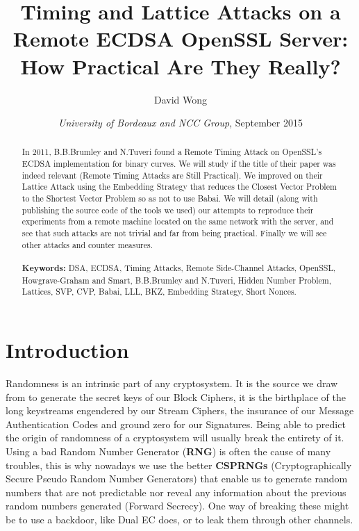 \documentclass[a4paper,11pt]{article}
\title{Timing and Lattice Attacks on a Remote ECDSA OpenSSL Server: How Practical Are They Really?}
\author{David Wong}
\date{\emph{University of Bordeaux and NCC Group}, \small{September 2015}}
\begin{document}
\maketitle

\renewcommand{\abstractname}{Abstract}
\begin{abstract}
In 2011, B.B.Brumley and N.Tuveri found a Remote Timing Attack on OpenSSL's ECDSA implementation for binary curves. We will study if the title of their paper was indeed relevant (Remote Timing Attacks are Still Practical). We improved on their Lattice Attack using the Embedding Strategy that reduces the Closest Vector Problem to the Shortest Vector Problem so as not to use Babai. We will detail (along with publishing the source code of the tools we used) our attempts to reproduce their experiments from a remote machine located on the same network with the server, and see that such attacks are not trivial and far from being practical. Finally we will see other attacks and counter measures.\\
\\
\textbf{Keywords:} DSA, ECDSA, Timing Attacks, Remote Side-Channel Attacks, OpenSSL, Howgrave-Graham and Smart, B.B.Brumley and N.Tuveri, Hidden Number Problem, Lattices, SVP, CVP, Babai, LLL, BKZ, Embedding Strategy, Short Nonces.\\

\end{abstract}

\section{Introduction}\label{introduction}

Randomness is an intrinsic part of any cryptosystem. It is the source we draw from to generate the secret keys of our Block Ciphers, it is the birthplace of the long keystreams engendered by our Stream Ciphers, the insurance of our Message Authentication Codes and ground zero for our Signatures. Being able to predict the origin of randomness of a cryptosystem will usually break the entirety of it. Using a bad Random Number Generator (\textbf{RNG}) is often the cause of many troubles, this is why nowadays we use the better \textbf{CSPRNGs} (Cryptographically Secure Pseudo Random Number Generators) that enable us to generate random numbers that are not predictable nor reveal any information about the previous random numbers generated (Forward Secrecy). One way of breaking these might be to use a backdoor, like Dual EC\cite{dualec} does, or to leak them through other channels.
\end{document}

